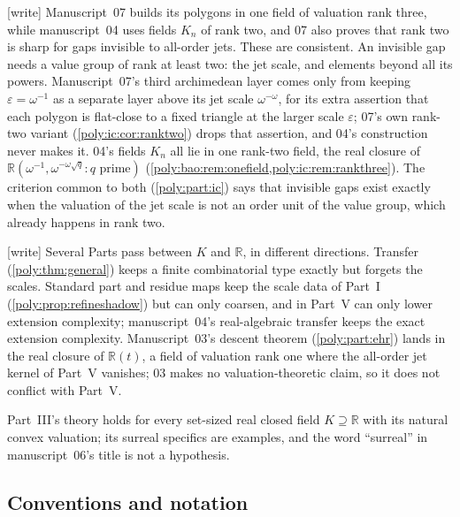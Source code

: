 \documentclass[11pt,a4paper]{article}
\numberwithin{equation}{section}
\theoremstyle{plain}
\newcommand{\wtag}{\textup{[write]}}%
\newcommand{\R}{\mathbb R}
\newcommand{\eps}{\varepsilon}
\begin{document}
\begin{remark}\label{poly:rem:rankthree}
\wtag{} Manuscript~07 builds its polygons in one field of valuation rank
three, while manuscript~04 uses fields $K_n$ of rank two, and 07 also proves
that rank two is sharp for gaps invisible to all-order jets. These are
consistent. An invisible gap needs a value group of rank at least two: the
jet scale, and elements beyond all its powers. Manuscript~07's third
archimedean layer comes only from keeping $\eps=\omega^{-1}$ as a separate
layer above its jet scale $\omega^{-\omega}$, for its extra assertion that
each polygon is flat-close to a fixed triangle at the larger scale $\eps$;
07's own rank-two variant (\cref{poly:ic:cor:ranktwo}) drops that
assertion, and 04's construction never makes it. 04's fields $K_n$ all lie
in one rank-two field, the real closure of
$\R(\omega^{-1},\omega^{-\omega\sqrt q}:q\text{ prime})$
(\cref{poly:bao:rem:onefield,poly:ic:rem:rankthree}). The criterion
common to both (\cref{poly:part:ic}) says that invisible gaps exist exactly
when the valuation of the jet scale is not an order unit of the value group,
which already happens in rank two.
\end{remark}

\begin{remark}
\wtag{} Several Parts pass between $K$ and $\R$, in different directions.
Transfer (\cref{poly:thm:general}) keeps a finite combinatorial type exactly
but forgets the scales. Standard part and residue maps keep the scale data
of Part~I (\cref{poly:prop:refineshadow}) but can only coarsen, and in
Part~V can only lower extension complexity; manuscript~04's real-algebraic
transfer keeps the exact extension complexity. Manuscript~03's descent
theorem (\cref{poly:part:ehr}) lands in the real closure of $\R(t)$, a
field of valuation rank one where the all-order jet kernel of Part~V
vanishes; 03 makes no valuation-theoretic claim, so it does not conflict
with Part~V.
\end{remark}

Part~III's theory holds for every set-sized real closed field
$K\supseteq\R$ with its natural convex valuation; its surreal specifics are
examples, and the word ``surreal'' in manuscript~06's title is not a
hypothesis.

\subsection{Conventions and notation}\label{poly:sec:notation}
\end{document}
